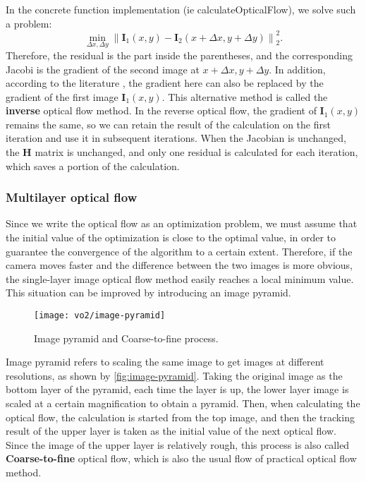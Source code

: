 In the concrete function implementation (ie calculateOpticalFlow), we solve such a problem:
\begin{equation}
\mathop {\min }\limits_{\Delta x,\Delta y} \left\| {{\bm{I}_1}\left( {x,y} \right) - {\bm{I}_2} \left( {x + \Delta x,y + \Delta y} \right)} \right\|_2^2.
\end{equation}
Therefore, the residual is the part inside the parentheses, and the corresponding Jacobi is the gradient of the second image at $x + \Delta x, y + \Delta y$. In addition, according to the literature \cite{Baker2004}, the gradient here can also be replaced by the gradient of the first image $\bm{I}_1 (x,y)$. This alternative method is called the \textbf{inverse} optical flow method. In the reverse optical flow, the gradient of $\bm{I}_1 (x,y)$ remains the same, so we can retain the result of the calculation on the first iteration and use it in subsequent iterations. When the Jacobian is unchanged, the $\bm{H}$ matrix is ​​unchanged, and only one residual is calculated for each iteration, which saves a portion of the calculation.

\subsubsection{Multilayer optical flow}
Since we write the optical flow as an optimization problem, we must assume that the initial value of the optimization is close to the optimal value, in order to guarantee the convergence of the algorithm to a certain extent. Therefore, if the camera moves faster and the difference between the two images is more obvious, the single-layer image optical flow method easily reaches a local minimum value. This situation can be improved by introducing an image pyramid.

\begin{figure}[!htp]
\centering
\texttt{[image: vo2/image-pyramid]}
\caption{Image pyramid and Coarse-to-fine process. }
\label{fig:image-pyramid}
\end{figure}

Image pyramid refers to scaling the same image to get images at different resolutions, as shown by \autoref{fig:image-pyramid}. Taking the original image as the bottom layer of the pyramid, each time the layer is up, the lower layer image is scaled at a certain magnification to obtain a pyramid. Then, when calculating the optical flow, the calculation is started from the top image, and then the tracking result of the upper layer is taken as the initial value of the next optical flow. Since the image of the upper layer is relatively rough, this process is also called \textbf{Coarse-to-fine} optical flow, which is also the usual flow of practical optical flow method.

